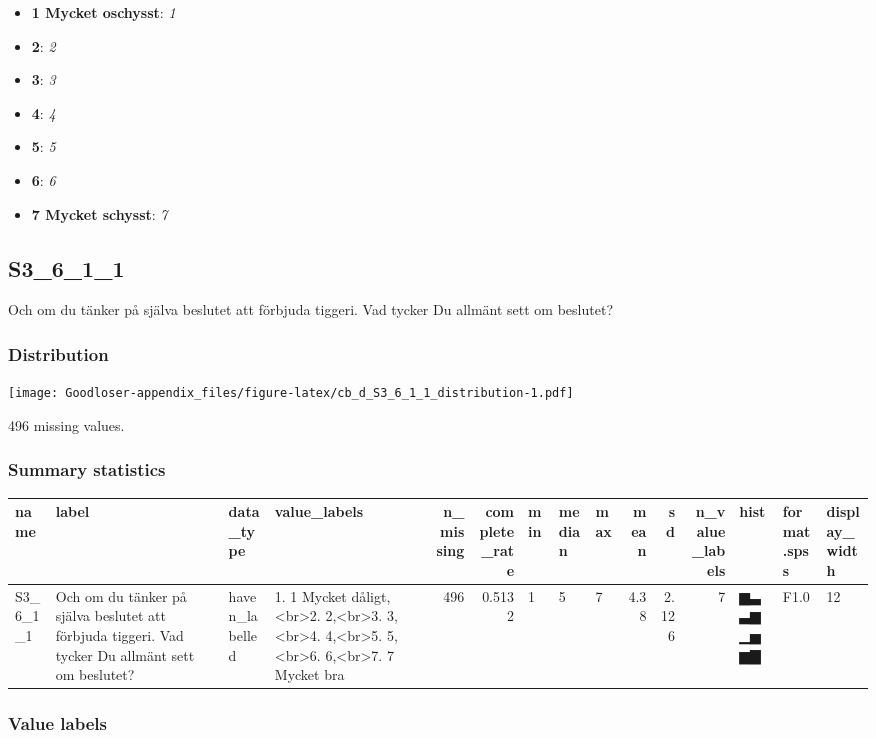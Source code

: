 \documentclass[
]{book}
\providecommand{\tightlist}{%
  \setlength{\itemsep}{0pt}\setlength{\parskip}{0pt}}
\begin{document}
\begin{itemize}
\tightlist
\item
  \textbf{1 Mycket oschysst}: \emph{1}
\item
  \textbf{2}: \emph{2}
\item
  \textbf{3}: \emph{3}
\item
  \textbf{4}: \emph{4}
\item
  \textbf{5}: \emph{5}
\item
  \textbf{6}: \emph{6}
\item
  \textbf{7 Mycket schysst}: \emph{7}
\end{itemize}

\hypertarget{S3_6_1_1}{%
\subsection{S3\_6\_1\_1}\label{S3_6_1_1}}

Och om du tänker på själva beslutet att förbjuda tiggeri. Vad tycker Du allmänt sett om beslutet?

\hypertarget{S3_6_1_1_distribution}{%
\subsubsection{Distribution}\label{S3_6_1_1_distribution}}

\texttt{[image: Goodloser-appendix\_files/figure-latex/cb\_d\_S3\_6\_1\_1\_distribution-1.pdf]}

496 missing values.

\hypertarget{S3_6_1_1_summary}{%
\subsubsection{Summary statistics}\label{S3_6_1_1_summary}}

\begin{tabular}{l|l|l|l|r|r|l|l|l|r|r|r|l|l|l}
\hline
name & label & data_type & value_labels & n_missing & complete_rate & min & median & max & mean & sd & n_value_labels & hist & format.spss & display_width\\
\hline
S3_6_1_1 & Och om du tänker på själva beslutet att förbjuda tiggeri. Vad tycker Du allmänt sett om beslutet? & haven_labelled & 1. 1 Mycket dåligt,<br>2. 2,<br>3. 3,<br>4. 4,<br>5. 5,<br>6. 6,<br>7. 7 Mycket bra & 496 & 0.5132 & 1 & 5 & 7 & 4.38 & 2.126 & 7 & ▆▃▃▆▁▅▆▇ & F1.0 & 12\\
\hline
\end{tabular}

\hypertarget{S3_6_1_1_labels}{%
\subsubsection{Value labels}\label{S3_6_1_1_labels}}
\end{document}
